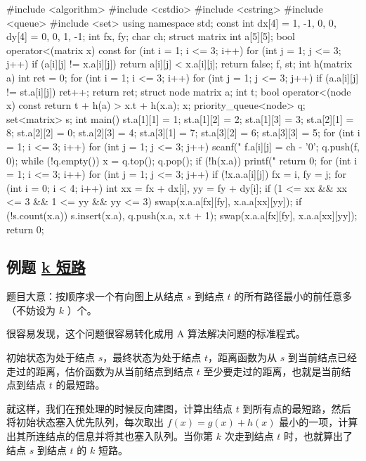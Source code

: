 \begin{cppcode}
#include <algorithm>
#include <cstdio>
#include <cstring>
#include <queue>
#include <set>
using namespace std;
const int dx[4] = {1, -1, 0, 0}, dy[4] = {0, 0, 1, -1};
int fx, fy;
char ch;
struct matrix {
  int a[5][5];
  bool operator<(matrix x) const {
    for (int i = 1; i <= 3; i++)
      for (int j = 1; j <= 3; j++)
        if (a[i][j] != x.a[i][j]) return a[i][j] < x.a[i][j];
    return false;
  }
} f, st;
int h(matrix a) {
  int ret = 0;
  for (int i = 1; i <= 3; i++)
    for (int j = 1; j <= 3; j++)
      if (a.a[i][j] != st.a[i][j]) ret++;
  return ret;
}
struct node {
  matrix a;
  int t;
  bool operator<(node x) const { return t + h(a) > x.t + h(x.a); }
} x;
priority_queue<node> q;
set<matrix> s;
int main() {
  st.a[1][1] = 1;
  st.a[1][2] = 2;
  st.a[1][3] = 3;
  st.a[2][1] = 8;
  st.a[2][2] = 0;
  st.a[2][3] = 4;
  st.a[3][1] = 7;
  st.a[3][2] = 6;
  st.a[3][3] = 5;
  for (int i = 1; i <= 3; i++)
    for (int j = 1; j <= 3; j++) {
      scanf(" %
      f.a[i][j] = ch - '0';
    }
  q.push({f, 0});
  while (!q.empty()) {
    x = q.top();
    q.pop();
    if (!h(x.a)) {
      printf("%
      return 0;
    }
    for (int i = 1; i <= 3; i++)
      for (int j = 1; j <= 3; j++)
        if (!x.a.a[i][j]) fx = i, fy = j;
    for (int i = 0; i < 4; i++) {
      int xx = fx + dx[i], yy = fy + dy[i];
      if (1 <= xx && xx <= 3 && 1 <= yy && yy <= 3) {
        swap(x.a.a[fx][fy], x.a.a[xx][yy]);
        if (!s.count(x.a)) s.insert(x.a), q.push({x.a, x.t + 1});
        swap(x.a.a[fx][fy], x.a.a[xx][yy]);
      }
    }
  }
  return 0;
}
\end{cppcode}

\subsection{例题 \href{https://www.luogu.org/problemnew/show/P2483}{k 短路}}

题目大意：按顺序求一个有向图上从结点 $s$ 到结点 $t$ 的所有路径最小的前任意多（不妨设为 $k$ ）个。

很容易发现，这个问题很容易转化成用 A 算法解决问题的标准程式。

初始状态为处于结点 $s$，最终状态为处于结点 $t$，距离函数为从 $s$ 到当前结点已经走过的距离，估价函数为从当前结点到结点 $t$ 至少要走过的距离，也就是当前结点到结点 $t$ 的最短路。

就这样，我们在预处理的时候反向建图，计算出结点 $t$ 到所有点的最短路，然后将初始状态塞入优先队列，每次取出 $f(x)=g(x)+h(x)$ 最小的一项，计算出其所连结点的信息并将其也塞入队列。当你第 $k$ 次走到结点 $t$ 时，也就算出了结点 $s$ 到结点 $t$ 的 $k$ 短路。

